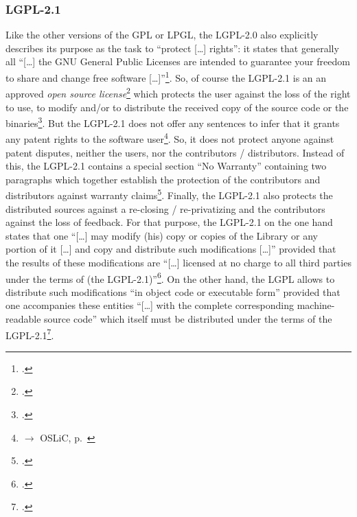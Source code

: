 \subsubsection {LGPL-2.1} \label{subsec:ProtectingPowerOfLgpl21}

Like the other versions of the GPL or LPGL, the LGPL-2.0 also explicitly
describes its purpose as the task to \enquote{protect [\ldots] rights}: it
states that generally all \enquote{[\ldots] the GNU General Public Licenses are
intended to guarantee your freedom to share and change free software
[\ldots]}\footcite[cf.][\nopage wp, Preamble]{Lgpl21OsiLicense1999a}. So, of
course the LGPL-2.1 is an an approved \emph{open source
license}\footcite[cf.][\nopage wp]{OSI2012b} which protects the user against the
loss of the right to use, to modify and/or to distribute the received copy of
the source code or the binaries\footcite[cf.][\nopage wp §1, §2,
§4]{Lgpl21OsiLicense1999a}. But the LGPL-2.1 does not offer any sentences to
infer that it grants any patent rights to the software
user\footnote{$\rightarrow$ OSLiC, p.\ \pageref{subsec:Lgpl21PatentClause}}. So,
it does not protect anyone against patent disputes, neither the users, nor the
contributors / distributors. Instead of this, the LGPL-2.1 contains a special
section \enquote{No Warranty} containing two paragraphs which together establish
the protection of the contributors and distributors against warranty
claims\footcite[cf.][\nopage wp §15, §16]{Lgpl21OsiLicense1999a}. Finally, the
LGPL-2.1 also protects the distributed sources against a re-closing /
re-privatizing and the contributors against the loss of feedback. For that
purpose, the LGPL-2.1 on the one hand states that one \enquote{[\ldots] may
modify (his) copy or copies of the Library or any portion of it [\ldots] and
copy and distribute such modifications [\ldots]} provided that the results of
these modifications are \enquote{[\ldots] licensed at no charge to all third
parties under the terms of (the LGPL-2.1)}\footcite[cf.][\nopage wp
§2]{Lgpl21OsiLicense1999a}. On the other hand, the LGPL allows to distribute
such modifications \enquote{in object code or executable form} provided that one
accompanies these entities \enquote{[\ldots] with the complete corresponding
machine-readable source code} which itself must be distributed under the terms
of the LGPL-2.1\footcite[cf.][\nopage wp §4]{Lgpl21OsiLicense1999a}.

